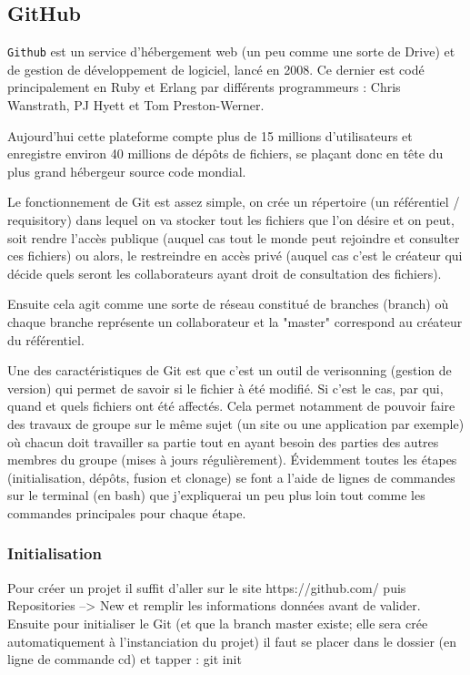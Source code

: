 \documentclass[a4paper, 12pt, twoside]{article}
\begin{document}
\subsection{GitHub}
\texttt{Github} est un service d'hébergement web (un peu comme une sorte de Drive) et de gestion de développement de logiciel, lancé en 2008. Ce dernier est codé principalement en Ruby et Erlang par différents programmeurs : Chris Wanstrath, PJ Hyett et Tom Preston-Werner.\newline

Aujourd'hui cette plateforme compte plus de 15 millions d'utilisateurs et enregistre environ 40 millions de dépôts de fichiers, se plaçant donc en tête du plus grand hébergeur source code mondial. \newline

Le fonctionnement de Git est assez simple, on crée un répertoire (un référentiel / requisitory) dans lequel on va stocker tout les fichiers que l'on désire et on peut, soit rendre l'accès publique (auquel cas tout le monde peut rejoindre et consulter ces fichiers) ou alors, le restreindre en accès privé (auquel cas c'est le créateur qui décide quels seront les collaborateurs ayant droit de consultation des fichiers). \newline

Ensuite cela agit comme une sorte de réseau constitué de branches (branch) où chaque branche représente un collaborateur et la "master" correspond au créateur du référentiel. \newline

Une des caractéristiques de Git est que c'est un outil de verisonning (gestion de version) qui permet  de savoir si le fichier à été modifié. Si c'est le cas, par qui, quand et quels fichiers ont été affectés. Cela permet notamment de pouvoir faire des travaux de groupe sur le même sujet (un site ou une application par exemple) où chacun doit travailler sa partie tout en ayant besoin des parties des autres membres du groupe (mises à jours régulièrement). \newline
Évidemment toutes les étapes (initialisation, dépôts, fusion et clonage) se font a l'aide de lignes de commandes sur le terminal (en bash) que j'expliquerai un peu plus loin tout comme les commandes principales pour chaque étape.\newline

\subsubsection{Initialisation}
Pour créer un projet il suffit d'aller sur le site  https://github.com/ puis Repositories --> New et remplir les informations données avant de valider. Ensuite pour initialiser le Git (et que la branch master existe; elle sera crée automatiquement à l'instanciation du projet) il faut se placer dans le dossier (en ligne de commande cd) et tapper :  git init \newline
\end{document}
